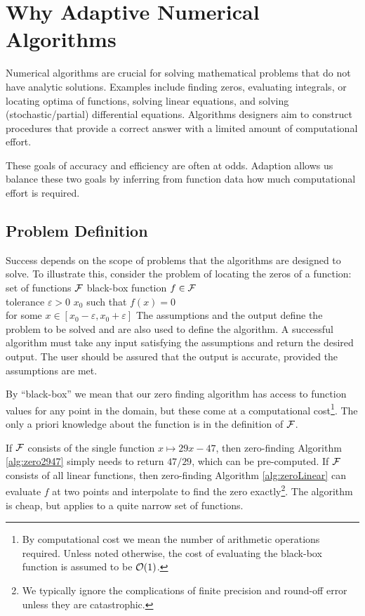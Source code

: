 \chapter{Why Adaptive Numerical Algorithms}
Numerical algorithms are crucial for solving mathematical problems that do not have analytic solutions.  Examples include finding zeros, evaluating integrals, or locating optima of functions, solving linear equations, and solving (stochastic/partial) differential equations.  Algorithms designers aim to construct procedures that provide a correct answer with a limited amount of computational effort.  

These goals of accuracy and efficiency are often at odds.  Adaption allows us balance these two goals by inferring from function data how much computational effort is required.

\section{Problem Definition}

Success depends on the scope of problems that the algorithms are designed to solve.  To illustrate this, consider the problem of locating the zeros of a function:
%
{set of functions $\mathcal{F}$}%
{black-box function $f \in \mathcal{F}$ \\ tolerance $\varepsilon > 0$ }%
{$x_0$ such that $f(x) = 0$ \\ 
    \qquad for some $x \in [x_0 - \varepsilon, x_0 + \varepsilon]$}
The assumptions and the output define the problem to be solved and are also used to define the algorithm. A successful algorithm must take any input satisfying the assumptions and return the desired output.   The user should be assured that the output is accurate, provided the assumptions are met.  

By ``black-box'' we mean that our zero finding algorithm has access to function values for any point in the domain, but these come at a computational cost\footnote{By computational cost we mean the number of arithmetic operations required.  Unless noted otherwise, the cost of evaluating the black-box function is assumed to be $\operatorname{{\mathcal O}}(1)$.}. The only a priori knowledge about the function is in the definition of $\mathcal{F}$.

If $\mathcal{F}$ consists of the single function $x \mapsto 29x - 47$, then zero-finding Algorithm \ref{alg:zero2947} simply needs to return $47/29$, which can be pre-computed.  If $\mathcal{F}$ consists of all linear functions, then zero-finding Algorithm \ref{alg:zeroLinear} can evaluate $f$ at two points and interpolate to find the zero exactly\footnote{We typically ignore the complications of finite precision and round-off error unless they are catastrophic.}.  The algorithm is cheap, but applies to a quite narrow set of functions.  

